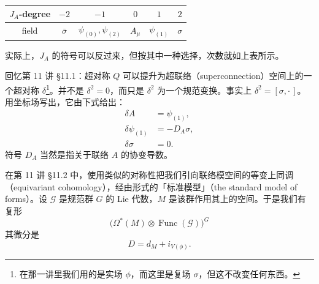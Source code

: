 \begin{center}
\begin{tabular}{|c|c|c|c|c|c|}
\hline
$J_A$-degree & $-2$ & $-1$ & $0$ & $1$ & $2$\\
\hline
field & $\bar\sigma$ & $\psi_{(0)},\psi_{(2)}$ & $A_\mu$ & $\psi_{(1)}$ & $\sigma$\\
\hline
\end{tabular}
\end{center}


实际上，$J_A$ 的符号可以反过来，但按其中一种选择，次数就如上表所示。

回忆第 11 讲 §11.1：超对称 $Q$ 可以提升为超联络（superconnection）空间上的一个超对称 $\delta$\footnote{在那一讲里我们用的是实场 $\phi$，而这里是复场 $\sigma$，但这不改变任何东西。}。并不是 $\delta^2=0$，而只是 $\delta^2$ 为一个规范变换。事实上 $\delta^2=[\sigma,\cdot\,]$。用坐标场写出，它由下式给出：
\[
\begin{aligned}
  \delta A&=\psi_{(1)},\\
  \delta\psi_{(1)}&=-D_A\sigma,\\
  \delta\sigma&=0.
\end{aligned}
\]
符号 $D_A$ 当然是指关于联络 $A$ 的协变导数。

在第 11 讲 §11.2 中，使用类似的对称性把我们引向联络模空间的等变上同调（equivariant cohomology），经由形式的「标准模型」（the standard model of forms）。设 $\mathcal G$ 是规范群 $G$ 的 Lie 代数，$M$ 是该群作用其上的空间。于是我们有复形
\[
  \bigl(\Omega^*(M)\otimes\operatorname{Func}(\mathcal G)\bigr)^G
\]
其微分是
\[
  D=d_M+i_{V(\phi)}.
\]


